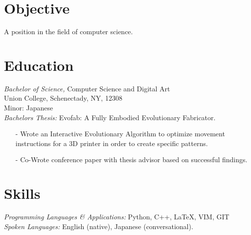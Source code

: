 \documentclass[margin, 10pt]{res} %
\begin{document}
\begin{resume}

 
\section{Objective}  

A position in the field of computer science.


\section{Education}

{\sl Bachelor of Science,} Computer Science and Digital Art \\
Union College, Schenectady, NY, 12308 \\
Minor: Japanese \\
{\sl Bachelors Thesis:} Evofab: A Fully Embodied Evolutionary Fabricator.
\begin{itemize} \itemsep -2pt
\item[-] Wrote an Interactive Evolutionary Algorithm to optimize movement instructions for a 3D printer in order to create specific patterns.
\item[-] Co-Wrote conference paper with thesis advisor based on successful findings.
\end{itemize}
 

\section{Skills} 

{\sl Programming Languages \& Applications:}
Python, C++, \LaTeX, VIM, GIT \\
{\sl Spoken Languages:}
English (native), Japanese (conversational). \\


\end{resume}
\end{document}

